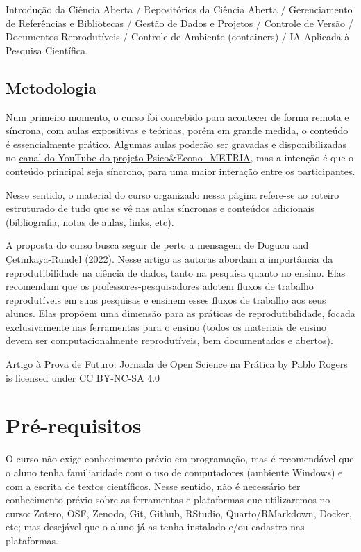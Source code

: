 \documentclass[
  a4paper,
]{article}
\begin{document}

Introdução da Ciência Aberta / Repositórios da Ciência Aberta /
Gerenciamento de Referências e Bibliotecas / Gestão de Dados e Projetos
/ Controle de Versão / Documentos Reprodutíveis / Controle de Ambiente
(containers) / IA Aplicada à Pesquisa Científica.

\subsection*{Metodologia}\label{sec-method}


Num primeiro momento, o curso foi concebido para acontecer de forma
remota e síncrona, com aulas expositivas e teóricas, porém em grande
medida, o conteúdo é essencialmente prático. Algumas aulas poderão ser
gravadas e disponibilizadas no
\href{https://www.youtube.com/c/PsicoEconoMETRIA}{canal do YouTube do
projeto Psico\&Econo\_METRIA}, mas a intenção é que o conteúdo principal
seja síncrono, para uma maior interação entre os participantes.

Nesse sentido, o material do curso organizado nessa página refere-se ao
roteiro estruturado de tudo que se vê nas aulas síncronas e conteúdos
adicionais (bibliografia, notas de aulas, links, etc).

A proposta do curso busca seguir de perto a mensagem de Dogucu and
Çetinkaya-Rundel (2022). Nesse artigo as autoras abordam a importância
da reprodutibilidade na ciência de dados, tanto na pesquisa quanto no
ensino. Elas recomendam que os professores-pesquisadores adotem fluxos
de trabalho reprodutíveis em suas pesquisas e ensinem esses fluxos de
trabalho aos seus alunos. Elas propõem uma dimensão para as práticas de
reprodutibilidade, focada exclusivamente nas ferramentas para o ensino
(todos os materiais de ensino devem ser computacionalmente
reprodutíveis, bem documentados e abertos).

Artigo à Prova de Futuro: Jornada de Open Science na Prática by Pablo
Rogers is licensed under CC BY-NC-SA 4.0


\section*{Pré-requisitos 📇}\label{sec-prework}


O curso não exige conhecimento prévio em programação, mas é recomendável
que o aluno tenha familiaridade com o uso de computadores (ambiente
Windows) e com a escrita de textos científicos. Nesse sentido, não é
necessário ter conhecimento prévio sobre as ferramentas e plataformas
que utilizaremos no curso: Zotero, OSF, Zenodo, Git, Github, RStudio,
Quarto/RMarkdown, Docker, etc; mas desejável que o aluno já as tenha
instalado e/ou cadastro nas plataformas.
\end{document}
